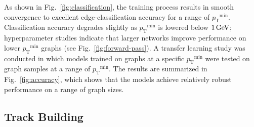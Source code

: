 \documentclass[twocolumn]{svjour3}
\newcommand{\pt}{\ensuremath{p_{\mathrm{T}}}\xspace}
\newcommand{\GeV}{\ensuremath{\,\text{Ge\hspace{-.08em}V}}\xspace}
\begin{document}
As shown in Fig.~\ref{fig:classification}, the training process results in smooth convergence to excellent edge-classification accuracy for a range of $\pt^\mathrm{min}$. 
Classification accuracy degrades slightly as $\pt^\mathrm{min}$ is lowered below $1\GeV$; hyperparameter studies indicate that larger networks improve performance on lower $\pt^\mathrm{min}$ graphs (see Fig.~\ref{fig:forward-pass}). 
A transfer learning study was conducted in which models trained on graphs at a specific $\pt^\mathrm{min}$ were tested on graph samples at a range of $\pt^\mathrm{min}$. 
The results are summarized in Fig.~\ref{fig:accuracy}, which shows that the models achieve relatively robust performance on a range of graph sizes. 


\subsection{Track Building}
\label{sec:trackbuilding}
\end{document}
